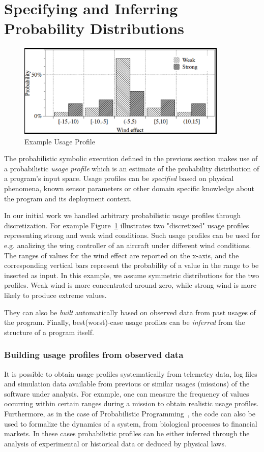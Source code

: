 \section{Specifying and Inferring Probability Distributions}
\label{sec:probspecs}

\begin{figure}
\centering
      \includegraphics[width=10cm]{up}
\caption{Example Usage Profile}
\label{fig:up}
\end{figure}


The probabilistic symbolic execution defined in the previous section
makes use of a probabilistic {\em usage profile} which is an estimate
of the probability distribution of a program's input space.  Usage
profiles can be {\em specified} based on physical phenomena, known
sensor parameters or other domain specific knowledge about the program
and its deployment context.  

In our initial work we handled arbitrary probabilistic usage profiles through discretization. For example Figure~\ref{fig:up} illustrates two "discretized" usage profiles representing strong and weak wind conditions. Such usage profiles can be used for e.g. analizing the wing controller of an aircraft under different wind conditions. The ranges of values for the wind effect are reported on the x-axis, and the corresponding vertical bars represent the probability of a value in the range to be inserted as input. In this example, we assume symmetric distributions for the two profiles. Weak wind is more concentrated around zero, while strong wind is more likely to produce extreme values.


They can also be {\em built}
automatically based on observed data from past usages of the program.
Finally, best(worst)-case usage profiles can be {\em inferred} from
the structure of a program itself.  

\subsubsection{Building usage profiles from observed data}
It is possible to obtain usage profiles systematically from
telemetry data, log files and simulation
data available from previous or similar usages (missions) of 
the software under analysis.
For example, one can measure
the frequency of values occurring within certain ranges
during a mission to obtain realistic usage profiles. 
Furthermore, as in the case of Probabilistic
Programming~\cite{Gordon2014}, the code can also be
used to formalize the dynamics of a system, from biological processes
to financial markets. In these cases probabilistic profiles can be
either inferred through the analysis of experimental or historical
data or deduced by physical laws.


